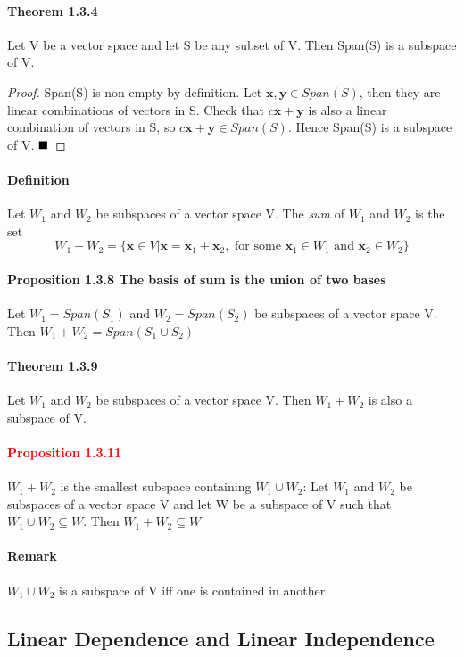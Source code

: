 \documentclass[11pt]{article}
\newcommand{\ti}[1]{\textit{#1}}
\newcommand{\tb}[1]{\textbf{#1}}
\newcommand{\qed}[0]{$\hfill\blacksquare$}
\newcommand{\vx}[0]{\tb{x}}
\newcommand{\vy}[0]{\tb{y}}
\begin{document}
	\paragraph{Theorem 1.3.4} Let V be a vector space and let S be any subset of V. Then Span(S) is a subspace of V. \newline\newline
	\begin{proof}
		Span(S) is non-empty by definition. Let $\vx, \vy \in Span(S)$, then they are linear combinations of vectors in S. Check that $c\vx + \vy$ is also a linear combination of vectors in S, so $c\vx + \vy \in Span(S)$. Hence Span(S) is a subspace of V. \qed
	\end{proof}
	\paragraph{Definition} Let $W_1$ and $W_2$ be subspaces of a vector space V. The \ti{sum} of $W_1$ and $W_2$ is the set $$W_1 + W_2 = \{ \vx \in V | \vx = \vx_1 + \vx_2, \mbox{ for some } \vx_1 \in W_1 \mbox{ and } \vx_2 \in W_2\}$$
	\paragraph{Proposition 1.3.8 The basis of sum is the union of two bases} Let $W_1 = Span(S_1)$ and $W_2 = Span(S_2)$ be subspaces of a vector space V. Then $W_1 + W_2 = Span(S_1 \cup S_2)$
	\paragraph{Theorem 1.3.9} Let $W_1$ and $W_2$ be subspaces of a vector space V. Then $W_1 + W_2$ is also a subspace of V.
	\paragraph{\textcolor{red}{Proposition 1.3.11}} $W_1 + W_2$ is the smallest subspace containing $W_1 \cup W_2$: \newline
	Let $W_1$ and $W_2$ be subspaces of a vector space V and let W be a subspace of V such that $W_1 \cup W_2 \subseteq W$. Then $W_1 + W_2 \subseteq W$
	\paragraph{Remark} $W_1 \cup W_2$ is a subspace of V iff one is contained in another.
	
	
	
	\subsection{Linear Dependence and Linear Independence} 
\end{document}
